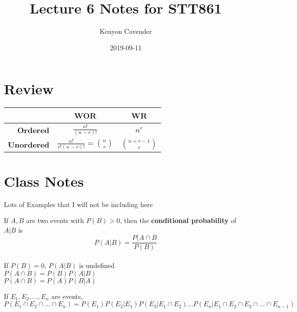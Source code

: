 \documentclass[14pt, oneside, letterpaper]{notes}
\begin{document}
\title{Lecture 6 Notes for STT861}
\author{Kenyon Cavender}
\date{2019-09-11}
\maketitle

\section{Review}
\begin{table}[h!]
	\begin{center}
		\begin{tabular}{r|c|c}
			& \textbf{WOR} & \textbf{WR} \\
			\hline
			
			\textbf{Ordered} 
			& $\displaystyle \frac{n!}{(n-r)!} $ 
			& $\displaystyle n^r $ \\
			
			\textbf{Unordered} 
			& $\displaystyle \frac{n!}{r!(n-r)!} 
			= {n \choose r} $ 
			& $\displaystyle {n+r-1 \choose r} $ \\

		\end{tabular}
	\end{center}
\end{table}


\section{Class Notes}
Lots of Examples that I will not be including here

\begin{mydef}
	If $A,B$ are two events with $P(B) > 0$, then the 
	\textbf{conditional probability} of $A|B$ is \[P(A|B) = 
	\frac{P(A \cap B}{P(B)}\] \\
	If $P(B) = 0$, $P(A|B)$ is undefined \\
	$P(A \cap B) = P(B)P(A|B)$ \\
	$P(A \cap B) = P(A)P(B|A)$
\end{mydef}
\begin{mydef}
	If $E_1, E_2, ..., E_n$ are events, \\
	$P(E_1 \cap E_2 \cap ... \cap E_n) 
	= P(E_1)P(E_2 | E_1)P(E_3|E_1 \cap E_2)
	... P(E_n|E_1 \cap E_2 \cap E_3 \cap ... \cap E_{n-1})$
\end{mydef}
\end{document}
